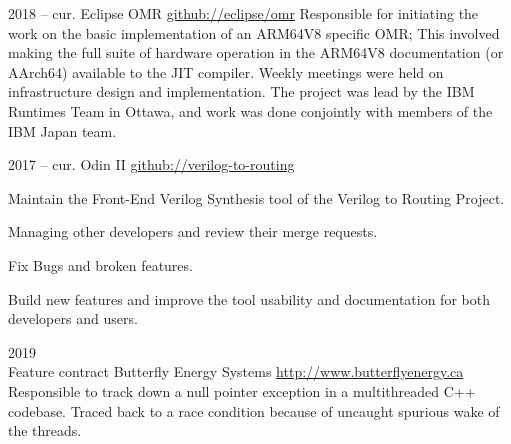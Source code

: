 \documentclass{developercv} %
\begin{document}

\begin{entrylist}

	\entry
	{2018 -- cur.}
	{Eclipse OMR}
	{\href{https://github.com/eclipse/omr}{github://eclipse/omr}}{
		Responsible for initiating the work on the basic implementation of an ARM64V8 specific OMR; This involved making the full suite of hardware operation in the ARM64V8 documentation (or AArch64) available to the JIT compiler.
		Weekly meetings were held on infrastructure design and implementation.
		The project was lead by the IBM Runtimes Team in Ottawa, and work was done conjointly with members of the IBM Japan team.
	}

	\entry
	{2017 -- cur.}
	{Odin II}
	{\href{https://github.com/verilog-to-routing/vtr-verilog-to-routing/graphs/contributors}{github://verilog-to-routing}}{
		Maintain the Front-End Verilog Synthesis tool of the Verilog to Routing Project.
		\begin{tightemize}
			\item Managing other developers and review their merge requests.
			\item Fix Bugs and broken features.
			\item Build new features and improve the tool usability and documentation for both developers and users.
		\end{tightemize}
	}

	\entry
	{2019 \\{\footnotesize Feature contract}}
	{Butterfly Energy Systems}
	{\href{http://www.butterflyenergy.ca/home.php}{http://www.butterflyenergy.ca}}{
	Responsible to track down a null pointer exception in a multithreaded C++ codebase.
	Traced back to a race condition because of uncaught spurious wake of the threads.
	}

\end{entrylist}



\vspace*{\baselineskip}


\vspace*{\baselineskip}
\end{document}
